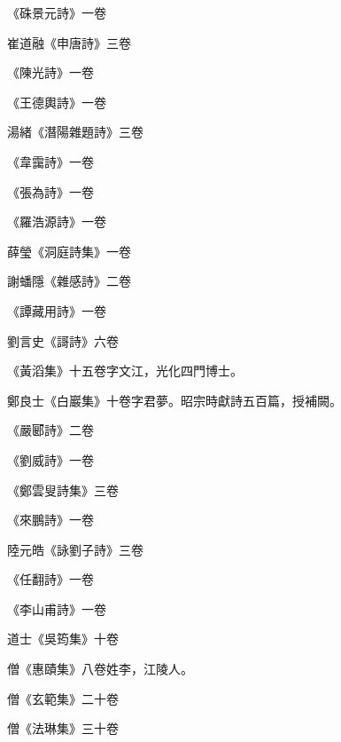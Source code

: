 \begin{pinyinscope}
 《硃景元詩》一卷



 崔道融《申唐詩》三卷



 《陳光詩》一卷



 《王德輿詩》一卷



 湯緒《潛陽雜題詩》三卷



 《韋靄詩》一卷



 《張為詩》一卷



 《羅浩源詩》一卷



 薛瑩《洞庭詩集》一卷



 謝蟠隱《雜感詩》二卷



 《譚藏用詩》一卷



 劉言史《謌詩》六卷



 《黃滔集》十五卷字文江，光化四門博士。



 鄭良士《白巖集》十卷字君夢。昭宗時獻詩五百篇，授補闕。



 《嚴郾詩》二卷



 《劉威詩》一卷



 《鄭雲叟詩集》三卷



 《來鵬詩》一卷



 陸元皓《詠劉子詩》三卷



 《任翻詩》一卷



 《李山甫詩》一卷



 道士《吳筠集》十卷



 僧《惠賾集》八卷姓李，江陵人。



 僧《玄範集》二十卷



 僧《法琳集》三十卷




\end{pinyinscope}

